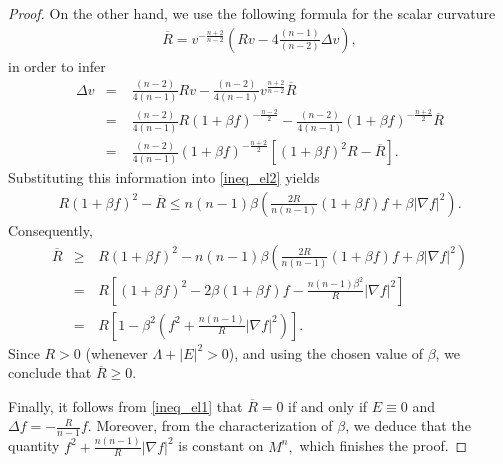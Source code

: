 \documentclass[10pt,a4paper]{amsart}
\begin{document}
\begin{proof}
		On the other hand, we use the following formula for the scalar curvature 
		\begin{eqnarray*}
			{\overline{R}}=v^{-\frac{n+2}{n-2}}\left(R v-4\frac{(n-1)}{(n-2)}\Delta v\right),
		\end{eqnarray*} 
		in order to infer
		\begin{eqnarray*}
			\Delta v&=&\;\frac{(n-2)}{4(n-1)}R v-\frac{(n-2)}{4(n-1)}v^{\frac{n+2}{n-2}}{\overline{R}}\\
			&=&\;\frac{(n-2)}{4(n-1)}R (1+\beta f)^{-\frac{n-2}{2}}-\frac{(n-2)}{4(n-1)}(1+\beta f)^{-\frac{n+2}{2}}{\overline{R}}\\
			&=&\;\frac{(n-2)}{4(n-1)}(1+\beta f)^{-\frac{n+2}{2}}\left[(1+\beta f)^2R-{\overline{R}}\right].
		\end{eqnarray*}
		Substituting this information into \eqref{ineq_el2} yields
		\begin{eqnarray*}
			R(1+\beta f)^2- {\overline{R}}\leq n(n-1)\beta \left(\frac{2 R}{n(n-1)}(1+\beta f)f+\beta|\nabla f|^2\right).
		\end{eqnarray*} 
		Consequently,
		\begin{eqnarray}\nonumber
			{\overline{R}}&\geq &\, R(1+\beta f)^2-n(n-1)\beta \left(\frac{2 R}{n(n-1)}(1+\beta f)f+\beta|\nabla f|^2\right)\\\nonumber
			&=&\, R\left[(1+\beta f)^2-2\beta(1+\beta f)f-\frac{n(n-1)\beta^2}{R}|\nabla f|^2\right]\\\label{eqq3}
			&=&\, R\left[1-\beta^2\left(f^2+\frac{n(n-1)}{R}|\nabla f|^2\right)\right].
		\end{eqnarray} Since $R>0$ (whenever $\Lambda+|E|^{2}>0$), and using the chosen value of $\beta$, we conclude that ${\overline{R}}\geq 0.$
		
		Finally, it follows from \eqref{ineq_el1} that ${\overline{R}}=0$ if and only if $E\equiv 0$ and $\Delta f=-\frac{R}{n-1}f$.  Moreover, from the characterization of $\beta$, we deduce that the quantity $f^2+\frac{n(n-1)}{R}|\nabla f|^2$ is constant on $M^n,$ which finishes the proof. 
\end{proof}
\end{document}
